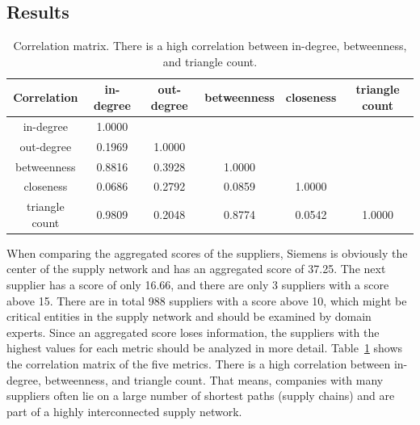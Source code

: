 \documentclass[
]{ceurart}
\begin{document}
\subsection{Results}
\begin{table}
\caption{Correlation matrix. There is a high correlation between in-degree, betweenness, and triangle count.}
\begin{center}
\addtolength{\tabcolsep}{0pt}
\begin{tabular}{|c | c c c c c|}
\hline
Correlation & in-degree & out-degree & betweenness & closeness & triangle count\\
\hline
in-degree & 1.0000 & & &  &\\
out-degree & 0.1969 &1.0000&  &  & \\
betweenness & 0.8816 & 0.3928 & 1.0000 & &\\
closeness & 0.0686 & 0.2792& 0.0859 & 1.0000 &\\
triangle count & 0.9809 & 0.2048 & 0.8774 & 0.0542 & 1.0000 \\
\hline
\end{tabular}
\label{tab:correlation}
\end{center}
\end{table}
When comparing the aggregated scores of the suppliers, Siemens is obviously the center of the supply network and has an aggregated score of 37.25. The next supplier has a score of only 16.66, and there are only 3 suppliers with a score above 15. There are in total 988 suppliers with a score above 10, which might be critical entities in the supply network and should be examined by domain experts. Since an aggregated score loses information, the suppliers with the highest values for each metric should be analyzed in more detail.
Table~\ref{tab:correlation} shows the correlation matrix of the five metrics. There is a high correlation between in-degree, betweenness, and triangle count. That means, companies with many suppliers often lie on a large number of shortest paths (supply chains) and are part of a highly interconnected supply network.
\end{document}

